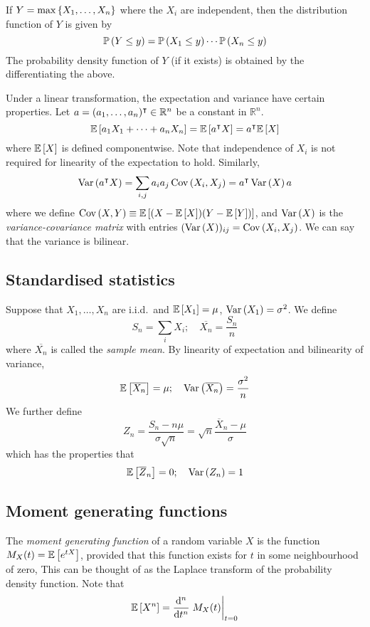 If \( Y = \max\qty{X_1, \dots, X_n} \) where the \( X_i \) are independent, then the distribution function of \( Y \) is given by
\[ \mathbb{P}\left({Y \leq y}\right) = \mathbb{P}\left({X_1 \leq y}\right) \cdots \mathbb{P}\left({X_n \leq y}\right) \]
The probability density function of \( Y \) (if it exists) is obtained by the differentiating the above.

Under a linear transformation, the expectation and variance have certain properties.
Let \( a = (a_1, \dots, a_n)^\intercal \in \mathbb R^n \) be a constant in \( \mathbb R^n \).
\[ \mathbb{E}\left[{a_1 X_1 + \dots + a_n X_n}\right] = \mathbb{E}\left[{a^\intercal X}\right] = a^\intercal \mathbb{E}\left[{X}\right] \]
where \( \mathbb{E}\left[{X}\right] \) is defined componentwise.
Note that independence of \( X_i \) is not required for linearity of the expectation to hold.
Similarly,
\[ \operatorname{Var}\left({a^\intercal X}\right) = \sum_{i,j} a_i a_j \operatorname{Cov}\left({X_i, X_j}\right) = a^\intercal \operatorname{Var}\left({X}\right) a \]
where we define \( \operatorname{Cov}\left({X, Y}\right) \equiv \mathbb{E}\left[{(X - \mathbb{E}\left[{X}\right])(Y - \mathbb{E}\left[{Y}\right])}\right] \), and \( \operatorname{Var}\left({X}\right) \) is the \textit{variance-covariance matrix} with entries \( (\operatorname{Var}\left({X}\right))_{ij} = \operatorname{Cov}\left({X_i, X_j}\right) \).
We can say that the variance is bilinear.

\subsection{Standardised statistics}
Suppose that \( X_1, \dots, X_n \) are i.i.d.\ and \( \mathbb{E}\left[{X_1}\right] = \mu \), \( \operatorname{Var}\left({X_1}\right) = \sigma^2 \).
We define
\[ S_n = \sum_i X_i;\quad \overline{X_n} = \frac{S_n}{n} \]
where \( \overline{X_n} \) is called the \textit{sample mean}.
By linearity of expectation and bilinearity of variance,
\[ \mathbb{E}\left[{\overline{X_n}}\right] = \mu;\quad \operatorname{Var}\left({\overline {X_n}}\right) = \frac{\sigma^2}{n} \]
We further define
\[ Z_n = \frac{S_n - n\mu}{\sigma\sqrt{n}} = \sqrt{n} \frac{\overline X_n - \mu}{\sigma} \]
which has the properties that
\[ \mathbb{E}\left[{\overline Z_n}\right] = 0;\quad \operatorname{Var}\left({Z_n}\right) = 1 \]

\subsection{Moment generating functions}
The \textit{moment generating function} of a random variable \( X \) is the function \( M_X(t) = \mathbb{E}\left[{e^{tX}}\right] \), provided that this function exists for \( t \) in some neighbourhood of zero,
This can be thought of as the Laplace transform of the probability density function.
Note that
\[ \expect{X^n} = \dv[n]{t} \eval{M_X(t)}_{t = 0} \]
